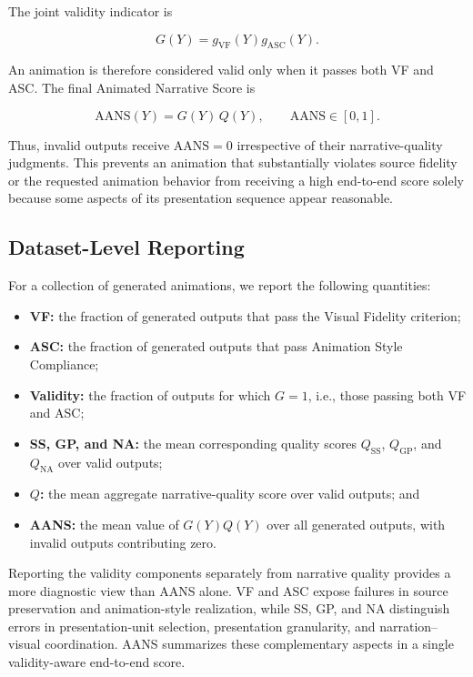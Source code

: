 \documentclass{article} %
\begin{document}
The joint validity indicator is

\[
G(Y)
=
g_{\mathrm{VF}}(Y)
g_{\mathrm{ASC}}(Y).
\]

An animation is therefore considered valid only when it passes both VF and
ASC. The final Animated Narrative Score is

\[
\mathrm{AANS}(Y)
=
G(Y)\,Q(Y),
\qquad
\mathrm{AANS}\in[0,1].
\]

Thus, invalid outputs receive $\mathrm{AANS}=0$ irrespective of their
narrative-quality judgments. This prevents an animation that substantially
violates source fidelity or the requested animation behavior from receiving a
high end-to-end score solely because some aspects of its presentation sequence
appear reasonable.

\subsection{Dataset-Level Reporting}
\label{sec:supp_dataset_reporting}

For a collection of generated animations, we report the following quantities:

\begin{itemize}
    \item \textbf{VF:} the fraction of generated outputs that pass the Visual
    Fidelity criterion;

    \item \textbf{ASC:} the fraction of generated outputs that pass Animation
    Style Compliance;

    \item \textbf{Validity:} the fraction of outputs for which $G=1$, i.e.,
    those passing both VF and ASC;

    \item \textbf{SS, GP, and NA:} the mean corresponding quality scores
    $Q_{\mathrm{SS}}$, $Q_{\mathrm{GP}}$, and $Q_{\mathrm{NA}}$ over valid
    outputs;

    \item \textbf{$Q$:} the mean aggregate narrative-quality score over valid
    outputs; and

    \item \textbf{AANS:} the mean value of $G(Y)Q(Y)$ over all generated
    outputs, with invalid outputs contributing zero.
\end{itemize}

Reporting the validity components separately from narrative quality provides a
more diagnostic view than AANS alone. VF and ASC expose failures in source
preservation and animation-style realization, while SS, GP, and NA distinguish
errors in presentation-unit selection, presentation granularity, and
narration--visual coordination. AANS summarizes these complementary aspects in
a single validity-aware end-to-end score.
\end{document}
